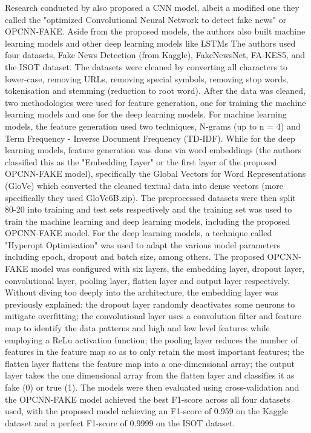 \documentclass[stu,12pt,floatsintext,donotrepeattitle]{apa7}
\begin{document}
Research conducted by \textcite{opcnn-fake} also proposed a CNN model, albeit a modified one they called the "optimized Convolutional Neural Network to detect fake news" or OPCNN-FAKE. Aside from the proposed models, the authors also built machine learning models and other deep learning models like LSTMs The authors used four datasets, Fake News Detection (from Kaggle), FakeNewsNet, FA-KES5, and the ISOT dataset. The datasets were cleaned by converting all characters to lower-case, removing URLs, removing special symbols, removing stop words, tokenisation and stemming (reduction to root word). After the data was cleaned, two methodologies were used for feature generation, one for training the machine learning models and one for the deep learning models. For machine learning models, the feature generation used two techniques, N-grams (up to n = 4) and Term Frequency - Inverse Document Frequency (TD-IDF). While for the deep learning models, feature generation was done via word embeddings (the authors classified this as the "Embedding Layer" or the first layer of the proposed OPCNN-FAKE model), specifically the Global Vectors for Word Representations (GloVe) which converted the cleaned textual data into dense vectors (more specifically they used GloVe6B.zip). The preprocessed datasets were then split 80-20 into training and test sets respectively and the training set was used to train the machine learning and deep learning models, including the proposed OPCNN-FAKE model. For the deep learning models, a technique called "Hyperopt Optimisation" was used to adapt the various model parameters including epoch, dropout and batch size, among others. The proposed OPCNN-FAKE model was configured with six layers, the embedding layer, dropout layer, convolutional layer, pooling layer, flatten layer and output layer respectively. Without diving too deeply into the architecture, the embedding layer was previously explained; the dropout layer randomly deactivates some neurons to mitigate overfitting; the convolutional layer uses a convolution filter and feature map to identify the data patterns and high and low level features while employing a ReLu activation function; the pooling layer reduces the number of features in the feature map so as to only retain the most important features; the flatten layer flattens the feature map into a one-dimensional array; the output layer takes the one dimensional array from the flatten layer and classifies it as fake (0) or true (1). The models were then evaluated using cross-validation and the OPCNN-FAKE model achieved the best F1-score across all four datasets used, with the proposed model achieving an F1-score of 0.959 on the Kaggle dataset and a perfect F1-score of 0.9999 on the ISOT dataset.
\end{document}
